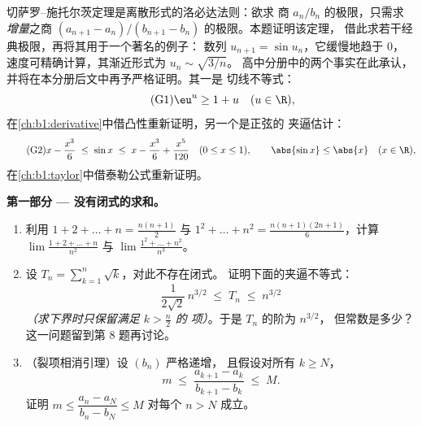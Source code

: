 \begin{problem}[{周末问题 --- 切萨罗--施托尔茨定理，
以及 $u_n \sim \sqrt{3/n}$ 的渐近性，对于 $u_{n+1} = \sin
u_n$}]
\label{pb:b1:seq:1}
切萨罗--施托尔茨定理是离散形式的洛必达法则：欲求
商 $a_n/b_n$ 的极限，只需求
\emph{增量}之商 $(a_{n+1} -
a_n)/(b_{n+1} - b_n)$ 的极限。本题证明该定理，
借此求若干经典极限，再将其用于一个著名的例子：
数列 $u_{n+1} = \sin u_n$，它缓慢地趋于 $0$，
速度可精确计算，其渐近形式为 $u_n \sim \sqrt{3/n}$。 高中分册中的两个事实在此承认，
并将在本分册后文中再予严格证明。其一是
切线不等式：
\[
\tag{G1} \eu^{u} \geq 1 + u \quad (u \in \R),
\]
在\cref{ch:b1:derivative}中借凸性重新证明，另一个是正弦的
夹逼估计：
\[
\tag{G2} x - \frac{x^3}{6} \;\leq\; \sin x \;\leq\; x -
\frac{x^3}{6} + \frac{x^5}{120} \quad (0 \leq x \leq 1), \qquad
\abs{\sin x} \leq \abs{x} \quad (x \in \R),
\]
在\cref{ch:b1:taylor}中借泰勒公式重新证明。

\medskip
\noindent\textbf{第一部分 --- 没有闭式的求和。}
\begin{enumerate}
  \item 利用 $1 + 2 + \dots + n = \frac{n(n+1)}{2}$ 与 $1^2 +
        \dots + n^2 = \frac{n(n+1)(2n+1)}{6}$，计算
        $\lim \frac{1 + 2 + \dots + n}{n^2}$ 与 $\lim \frac{1^2 +
        \dots + n^2}{n^3}$。
  \item 设 $T_n = \sum_{k=1}^n \sqrt k$，对此不存在闭式。
        证明下面的夹逼不等式：
        \[
        \frac{1}{2\sqrt 2}\,n^{3/2} \;\leq\; T_n \;\leq\;
        n^{3/2}
        \]
        \emph{（求下界时只保留满足 $k > \frac n2$ 的
        项）}。于是 $T_n$ 的阶为 $n^{3/2}$，
        但常数是多少？这一问题留到第 8 题再讨论。
  \item （裂项相消引理）设 $(b_n)$ 严格递增，
        且假设对所有 $k \geq N$，
        \[
        m \;\leq\; \frac{a_{k+1} - a_k}{b_{k+1} - b_k} \;\leq\;
        M .
        \]
        证明 $m \leq \dfrac{a_n - a_N}{b_n - b_N} \leq M$
        对每个 $n > N$ 成立。
\end{enumerate}


\end{problem}
